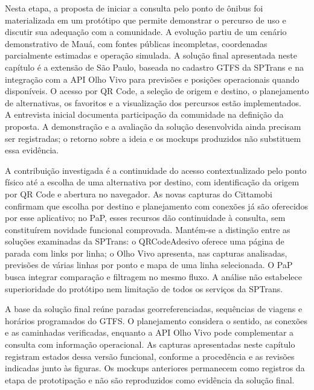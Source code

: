 \documentclass[12pt,oneside,a4paper,brazil,chapter=TITLE]{abntex2}
\begin{document}
Nesta etapa, a proposta de iniciar a consulta pelo ponto de ônibus foi materializada em um protótipo que permite demonstrar o percurso de uso e discutir sua adequação com a comunidade. A evolução partiu de um cenário demonstrativo de Mauá, com fontes públicas incompletas, coordenadas parcialmente estimadas e operação simulada. A solução final apresentada neste capítulo é a extensão de São Paulo, baseada no cadastro GTFS da SPTrans e na integração com a API Olho Vivo para previsões e posições operacionais quando disponíveis. O acesso por QR Code, a seleção de origem e destino, o planejamento de alternativas, os favoritos e a visualização dos percursos estão implementados. A entrevista inicial documenta participação da comunidade na definição da proposta. A demonstração e a avaliação da solução desenvolvida ainda precisam ser registradas; o retorno sobre a ideia e os mockups produzidos não substituem essa evidência.

A contribuição investigada é a continuidade do acesso contextualizado pelo ponto físico até a escolha de uma alternativa por destino, com identificação da origem por QR Code e abertura no navegador. As novas capturas do Cittamobi confirmam que escolha por destino e planejamento com conexões já são oferecidos por esse aplicativo; no PaP, esses recursos dão continuidade à consulta, sem constituírem novidade funcional comprovada. Mantém-se a distinção entre as soluções examinadas da SPTrans: o QRCodeAdesivo oferece uma página de parada com links por linha; o Olho Vivo apresenta, nas capturas analisadas, previsões de várias linhas por ponto e mapa de uma linha selecionada. O PaP busca integrar comparação e filtragem no mesmo fluxo. A análise não estabelece superioridade do protótipo nem limitação de todos os serviços da SPTrans.


A base da solução final reúne paradas georreferenciadas, sequências de viagens e horários programados do GTFS. O planejamento considera o sentido, as conexões e as caminhadas verificadas, enquanto a API Olho Vivo pode complementar a consulta com informação operacional. As capturas apresentadas neste capítulo registram estados dessa versão funcional, conforme a procedência e as revisões indicadas junto às figuras. Os mockups anteriores permanecem como registros da etapa de prototipação e não são reproduzidos como evidência da solução final.
\end{document}
